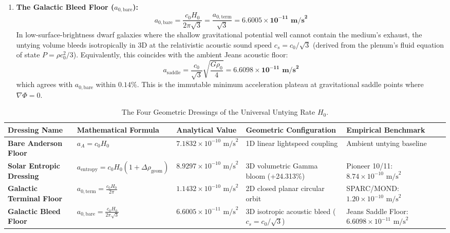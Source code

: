 \documentclass[11pt,a4paper]{article}
\begin{document}
\begin{enumerate}
    \item \textbf{The Galactic Bleed Floor ($a_{0,\text{bare}}$):}
    \begin{equation}
    a_{0,\text{bare}} = \frac{c_0 H_0}{2\pi\sqrt{3}} = \frac{a_{0,\text{term}}}{\sqrt{3}} = \mathbf{6.6005 \times 10^{-11}\text{ m/s}^2}
    \label{eq:galactic_bleed_floor}
    \end{equation}
    In low-surface-brightness dwarf galaxies where the shallow gravitational potential well cannot contain the medium's exhaust, the untying volume bleeds isotropically in 3D at the relativistic acoustic sound speed $c_s = c_0/\sqrt{3}$ (derived from the plenum's fluid equation of state $P = \rho c_0^2 / 3$).
    Equivalently, this coincides with the ambient Jeans acoustic floor:
    \begin{equation}
    a_{\text{saddle}} = \frac{c_0}{\sqrt{3}} \sqrt{\frac{G \rho_0}{4}} = \mathbf{6.6098 \times 10^{-11}\text{ m/s}^2}
    \label{eq:jeans_saddle_floor}
    \end{equation}
    which agrees with $a_{0,\text{bare}}$ within $0.14\%$. This is the immutable minimum acceleration plateau at gravitational saddle points where $\nabla\Phi = 0$.
\end{enumerate}

\begin{table}[!htbp]
\centering
\caption{The Four Geometric Dressings of the Universal Untying Rate $H_0$.}
\label{tab:four_dressings}
\footnotesize
\setlength{\tabcolsep}{4pt}
\renewcommand{\arraystretch}{1.2}
\begin{tabularx}{\textwidth}{L{2.6cm} L{3.6cm} L{2.7cm} Y L{3.0cm}}
\toprule
\textbf{Dressing Name} & \textbf{Mathematical Formula} & \textbf{Analytical Value} & \textbf{Geometric Configuration} & \textbf{Empirical Benchmark} \\
\midrule
\textbf{Bare Anderson Floor} & $a_A = c_0 H_0$ & $7.1832 \times 10^{-10}\text{ m/s}^2$ & 1D linear lightspeed coupling & Ambient untying baseline \\
\textbf{Solar Entropic Dressing} & $a_{\text{entropy}} = c_0 H_0(1 + \Delta\rho_{\text{geom}})$ & $8.9297 \times 10^{-10}\text{ m/s}^2$ & 3D volumetric Gamma bloom (+24.313\%) & Pioneer 10/11: $8.74 \times 10^{-10}\text{ m/s}^2$ \\
\textbf{Galactic Terminal Floor} & $a_{0,\text{term}} = \frac{c_0 H_0}{2\pi}$ & $1.1432 \times 10^{-10}\text{ m/s}^2$ & 2D closed planar circular orbit & SPARC/MOND: $1.20 \times 10^{-10}\text{ m/s}^2$ \\
\textbf{Galactic Bleed Floor} & $a_{0,\text{bare}} = \frac{c_0 H_0}{2\pi\sqrt{3}}$ & $6.6005 \times 10^{-11}\text{ m/s}^2$ & 3D isotropic acoustic bleed ($c_s = c_0/\sqrt{3}$) & Jeans Saddle Floor: $6.6098 \times 10^{-11}\text{ m/s}^2$ \\
\bottomrule
\end{tabularx}
\end{table}
\end{document}
